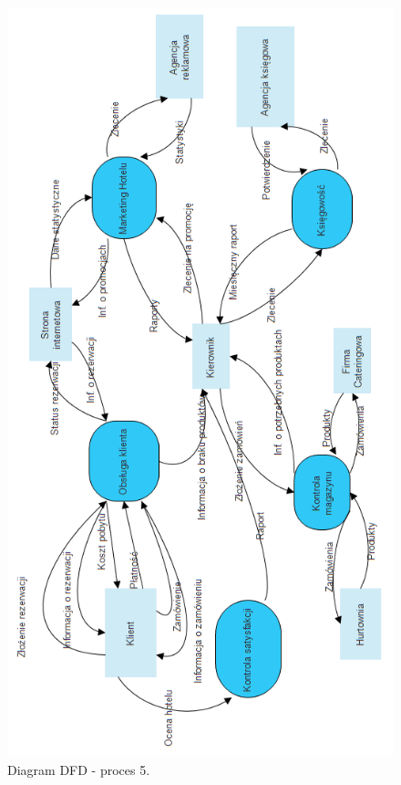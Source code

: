 \documentclass[a4paper, 11pt]{article}
\begin{document}
	\begin{figure}[H]%
			\center
			\includegraphics[scale=0.7]{Img/DFDpoziom0.png}
			\caption{Diagram DFD - proces 5.}
	\end{figure}
\end{document}
